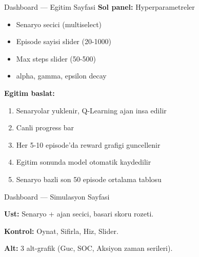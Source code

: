 \documentclass[10pt,aspectratio=169]{beamer}
\begin{document}
\begin{frame}{Dashboard --- Egitim Sayfasi}
\textbf{Sol panel:} Hyperparametreler
\begin{itemize}\footnotesize
  \item Senaryo secici (multiselect)
  \item Episode sayisi slider (20-1000)
  \item Max steps slider (50-500)
  \item alpha, gamma, epsilon decay
\end{itemize}

\textbf{Egitim baslat:}
\begin{enumerate}\footnotesize
  \item Senaryolar yuklenir, Q-Learning ajan insa edilir
  \item Canli progress bar
  \item Her 5-10 episode'da reward grafigi guncellenir
  \item Egitim sonunda model otomatik kaydedilir
  \item Senaryo bazli son 50 episode ortalama tablosu
\end{enumerate}
\end{frame}

\begin{frame}{Dashboard --- Simulasyon Sayfasi}
\begin{center}
\end{center}

\textbf{Ust:} Senaryo + ajan secici, basari skoru rozeti.

\textbf{Kontrol:} Oynat, Sifirla, Hiz, Slider.

\textbf{Alt:} 3 alt-grafik (Guc, SOC, Aksiyon zaman serileri).
\end{frame}
\end{document}
